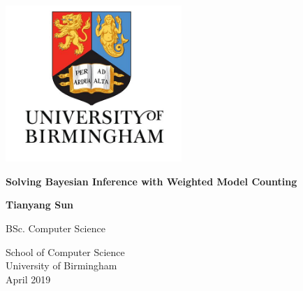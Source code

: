 \begin{titlepage}
    \begin{center}
        \includegraphics[width=0.5\textwidth]{pic/Bham_withname.jpg}
        \vspace*{2cm}
 
        \Huge
        \textbf{Solving Bayesian Inference with Weighted Model Counting}
 
        \vspace{0.5cm}
        
        \vspace{1.5cm}
        \Large
        \textbf{Tianyang Sun}
 
        \vspace{2.5cm}
 
        BSc. Computer Science
 
        \vspace{1.0 cm}
 
        \Large
        School of Computer Science\\
        University of Birmingham\\
        April 2019
 
    \end{center}
\end{titlepage}
